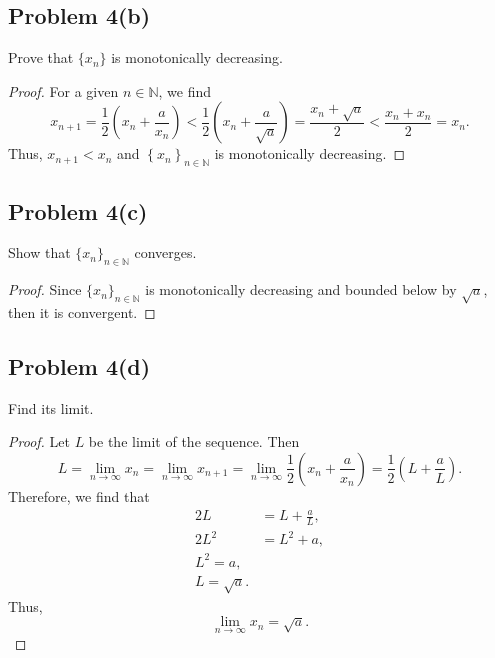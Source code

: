 \documentclass[12pt]{article}
\newenvironment{problem}
    {\begin{lrbox}{\mybox}\begin{minipage}{0.98\textwidth}}
    {\end{minipage}\end{lrbox}\framebox[\textwidth]{\usebox{\mybox}}}
\newcommand{\N}{\mathbb{N}} %
\newcommand{\<}{\left\langle} %
\renewcommand{\>}{\right\rangle} %
\newcommand{\seq}[2][n]{\left\{#2\right\}_{#1\in\N}} %
\begin{document}
\subsection*{Problem 4(b)}
\begin{problem}
    Prove that $\{x_n\}$ is monotonically decreasing.
\end{problem}

\begin{proof}
    For a given $n \in \N$, we find
    \[
        x_{n + 1} = \frac{1}{2} \left( x_n + \frac{a}{x_n} \right) < \frac{1}{2} \left( x_n + \frac{a}{\sqrt{a}} \right) = \frac{x_n + \sqrt{a}}{2} < \frac{x_n + x_n}{2} = x_n.
    \]
    Thus, $x_{n + 1} < x_n$ and $\seq{x_n}$ is monotonically decreasing.
    
\end{proof}

\newpage
\subsection*{Problem 4(c)}
\begin{problem}
    Show that $\{x_n\}_{n\in\N}$ converges.
\end{problem}

\begin{proof}
    Since $\{x_n\}_{n\in\N}$ is monotonically decreasing and bounded below by $\sqrt{a}$, then it is convergent.
    
\end{proof}

\subsection*{Problem 4(d)}
\begin{problem}
    Find its limit.
\end{problem}

\begin{proof}
    Let $L$ be the limit of the sequence. Then
    \[
        L = \lim_{n \to \infty} x_n = \lim_{n \to \infty} x_{n + 1} = \lim_{n \to \infty} \frac12 \left( x_n + \frac{a}{x_n} \right) = \frac12 \left( L + \frac{a}{L} \right).
    \]
    Therefore, we find that
    \begin{align*}
        2L &= L + \frac{a}{L}, \\
        2L^2 &= L^2 + a, \\
        L^2 = a, \\
        L = \sqrt{a}.
    \end{align*}
    Thus,
    \[
        \lim_{n \to \infty} x_n = \sqrt{a}.
    \]
    
\end{proof}
\end{document}
